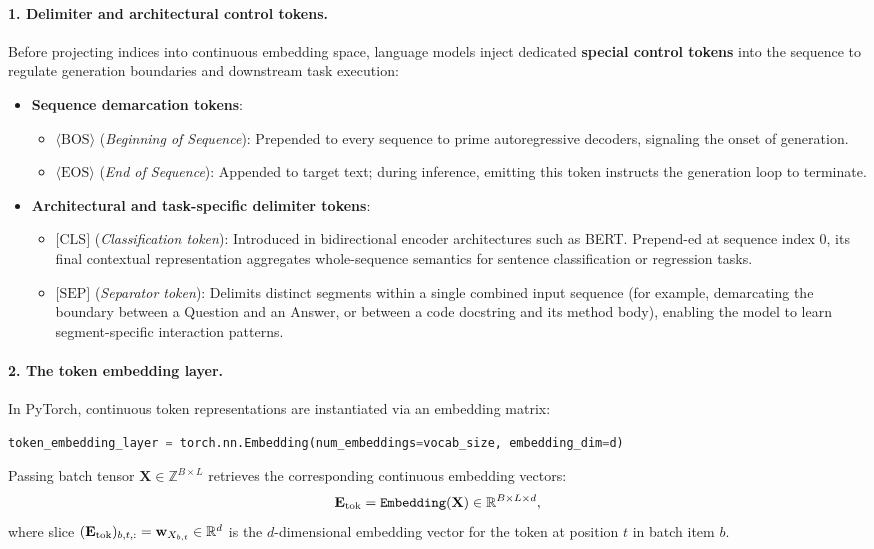 \documentclass[../../main.tex]{subfiles}
\begin{document}
\paragraph{1. Delimiter and architectural control tokens.}
Before projecting indices into continuous embedding space, language models inject dedicated \textbf{special control tokens} into the sequence to regulate generation boundaries and downstream task execution:
\begin{itemize}
    \item \textbf{Sequence demarcation tokens}:
    \begin{itemize}
        \item $\langle\text{BOS}\rangle$ (\emph{Beginning of Sequence}): Prepended to every sequence to prime autoregressive decoders, signaling the onset of generation.
        \item $\langle\text{EOS}\rangle$ (\emph{End of Sequence}): Appended to target text; during inference, emitting this token instructs the generation loop to terminate.
    \end{itemize}
    \item \textbf{Architectural and task-specific delimiter tokens}:
    \begin{itemize}
        \item $\text{[CLS]}$ (\emph{Classification token}): Introduced in bidirectional encoder architectures such as BERT. Prepend-ed at sequence index $0$, its final contextual representation aggregates whole-sequence semantics for sentence classification or regression tasks.
        \item $\text{[SEP]}$ (\emph{Separator token}): Delimits distinct segments within a single combined input sequence (for example, demarcating the boundary between a Question and an Answer, or between a code docstring and its method body), enabling the model to learn segment-specific interaction patterns.
    \end{itemize}
\end{itemize}

\paragraph{2. The token embedding layer.}
In PyTorch, continuous token representations are instantiated via an embedding matrix:
\begin{lstlisting}[language=Python]
token_embedding_layer = torch.nn.Embedding(num_embeddings=vocab_size, embedding_dim=d)
\end{lstlisting}
Passing batch tensor $\mathbf{X} \in \mathbb{Z}^{B \times L}$ retrieves the corresponding continuous embedding vectors:
\begin{equation}
\label{eq:token_embedding_lookup_batch}
\mathbf{E}_{\text{tok}} = \text{\texttt{Embedding}}(\mathbf{X}) \in \mathbb{R}^{B \times L \times d},
\end{equation}
where slice $(\mathbf{E}_{\text{tok}})_{b, t, :} = \mathbf{w}_{X_{b, t}} \in \mathbb{R}^d$ is the $d$-dimensional embedding vector for the token at position $t$ in batch item $b$.
\end{document}
